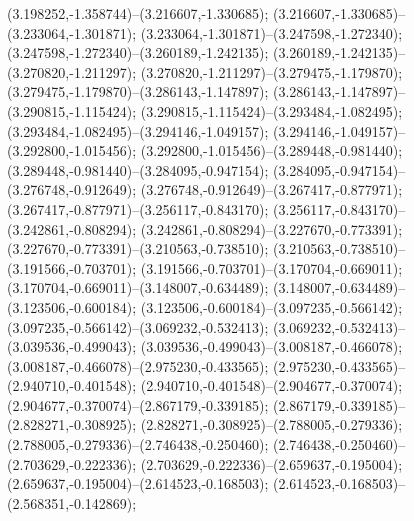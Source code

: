  (3.198252,-1.358744)--(3.216607,-1.330685);
 (3.216607,-1.330685)--(3.233064,-1.301871);
 (3.233064,-1.301871)--(3.247598,-1.272340);
 (3.247598,-1.272340)--(3.260189,-1.242135);
 (3.260189,-1.242135)--(3.270820,-1.211297);
 (3.270820,-1.211297)--(3.279475,-1.179870);
 (3.279475,-1.179870)--(3.286143,-1.147897);
 (3.286143,-1.147897)--(3.290815,-1.115424);
 (3.290815,-1.115424)--(3.293484,-1.082495);
 (3.293484,-1.082495)--(3.294146,-1.049157);
 (3.294146,-1.049157)--(3.292800,-1.015456);
 (3.292800,-1.015456)--(3.289448,-0.981440);
 (3.289448,-0.981440)--(3.284095,-0.947154);
 (3.284095,-0.947154)--(3.276748,-0.912649);
 (3.276748,-0.912649)--(3.267417,-0.877971);
 (3.267417,-0.877971)--(3.256117,-0.843170);
 (3.256117,-0.843170)--(3.242861,-0.808294);
 (3.242861,-0.808294)--(3.227670,-0.773391);
 (3.227670,-0.773391)--(3.210563,-0.738510);
 (3.210563,-0.738510)--(3.191566,-0.703701);
 (3.191566,-0.703701)--(3.170704,-0.669011);
 (3.170704,-0.669011)--(3.148007,-0.634489);
 (3.148007,-0.634489)--(3.123506,-0.600184);
 (3.123506,-0.600184)--(3.097235,-0.566142);
 (3.097235,-0.566142)--(3.069232,-0.532413);
 (3.069232,-0.532413)--(3.039536,-0.499043);
 (3.039536,-0.499043)--(3.008187,-0.466078);
 (3.008187,-0.466078)--(2.975230,-0.433565);
 (2.975230,-0.433565)--(2.940710,-0.401548);
 (2.940710,-0.401548)--(2.904677,-0.370074);
 (2.904677,-0.370074)--(2.867179,-0.339185);
 (2.867179,-0.339185)--(2.828271,-0.308925);
 (2.828271,-0.308925)--(2.788005,-0.279336);
 (2.788005,-0.279336)--(2.746438,-0.250460);
 (2.746438,-0.250460)--(2.703629,-0.222336);
 (2.703629,-0.222336)--(2.659637,-0.195004);
 (2.659637,-0.195004)--(2.614523,-0.168503);
 (2.614523,-0.168503)--(2.568351,-0.142869);
